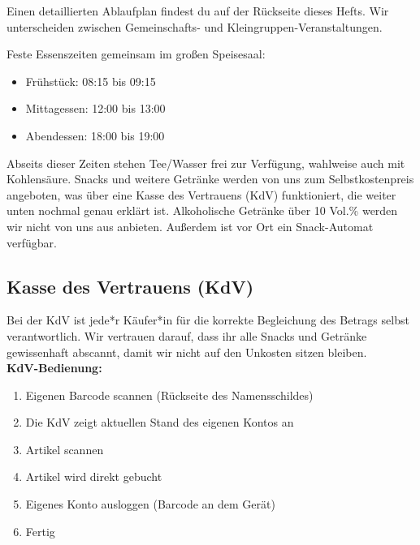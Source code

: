 \documentclass[a5paper,pagesize,twoside,fontsize=8pt,DIV=15]{scrreprt}
\begin{document}







Einen detaillierten Ablaufplan findest du auf der Rückseite dieses Hefts. Wir unterscheiden zwischen Gemeinschafts- und Kleingruppen-Veranstaltungen.

\vspace{-2mm}

Feste Essenszeiten gemeinsam im großen Speisesaal:
\begin{itemize}
\item Frühstück: 08:15 bis 09:15
\item Mittagessen: 12:00 bis 13:00
\item Abendessen: 18:00 bis 19:00
\end{itemize}


Abseits dieser Zeiten stehen Tee/Wasser frei zur Verfügung, wahlweise auch mit Kohlensäure. Snacks und weitere Getränke werden von uns zum Selbstkostenpreis angeboten, was über eine Kasse des Vertrauens (KdV) funktioniert, die weiter unten nochmal genau erklärt ist. Alkoholische Getränke über 10 Vol.\% werden wir nicht von uns aus anbieten. Außerdem ist vor Ort ein Snack-Automat verfügbar.


\subsection*{Kasse des Vertrauens (KdV)}

Bei der KdV ist jede*r Käufer*in für die korrekte Begleichung des Betrags selbst verantwortlich. Wir vertrauen darauf, dass ihr alle Snacks und Getränke gewissenhaft abscannt, damit wir nicht auf den Unkosten sitzen bleiben.\\

\textbf{KdV-Bedienung:}
\begin{enumerate}
    \item Eigenen Barcode scannen (Rückseite des Namensschildes)
    \item Die KdV zeigt aktuellen Stand des eigenen Kontos an
    \item Artikel scannen
    \item Artikel wird direkt gebucht 
    \item Eigenes Konto ausloggen (Barcode an dem Gerät)
    \item Fertig
\end{enumerate}
\end{document}
